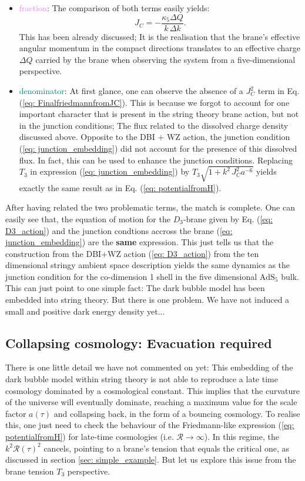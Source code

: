 \begin{itemize}
    \item \textcolor{violet}{fraction}: The comparison of both terms easily yields:
    \begin{equation}
        J_{C} = -\frac{\kappa_{5} \Delta Q}{ k \, \Delta k}. 
    \end{equation}
    This has been already discussed; It is the realisation that the brane's effective angular momentum in the compact directions translates to an effective charge $\Delta Q$ carried by the brane when observing the system from a five-dimensional perspective.
    \item \textcolor{teal}{denominator}: At first glance, one can observe the absence of a $J_{C}^{2}$ term in Eq. (\ref{eq: FinalfriedmannfromJC}). This is because we forgot to account for one important character that is present in the string theory brane action, but not in the junction conditions; The flux related to the dissolved charge density discussed above. Opposite to the DBI $+$ WZ action, the junction condition (\ref{eq: junction_embedding}) did not account for the presence of this dissolved flux. In fact, this can be used to enhance the junction conditions. Replacing $T_{3}$ in expression (\ref{eq: junction_embedding}) by $T_{3}\sqrt{1 + k^{2}\, J_{C}^{2} a^{-6}}$ yields exactly the same result as in Eq. (\ref{eq: potentialfromH}).
\end{itemize}
After having related the two problematic terms, the match is complete. One can easily see that, the equation of motion for the $D_{3}$-brane given by Eq. (\ref{eq: D3_action}) and the junction condtions accross the brane (\ref{eq: junction_embedding}) are the \textbf{same} expression. This just tells us that the construction from the DBI$+$WZ action (\ref{eq: D3_action}) from the ten dimensional stringy ambient space description yields the same dynamics as the junction condition for the co-dimension 1 shell in the five dimensional $\text{AdS}_{5}$ bulk. This can just point to one simple fact: The dark bubble model has been embedded into string theory. But there is one problem. We have not induced a small and positive dark energy density yet...

\subsection{Collapsing cosmology: Evacuation required} 
There is one little detail we have not commented on yet: This embedding of the dark bubble model within string theory is not able to reproduce a late time cosmology dominated by a cosmological constant. This implies that the curvature of the universe will eventually dominate, reaching a maximum value for the scale factor $a(\tau)$ and collapsing back, in the form of a bouncing cosmology. To realise this, one just need to check the behaviour of the Friedmann-like expression (\ref{eq: potentialfromH}) for late-time cosmologies (i.e. $\mathcal{R} \rightarrow \infty$). In this regime, the $k^{2} \mathcal{R}(\tau)^{2}$ cancels, pointing to a brane's tension that equals the critical one, as discussed in section \ref{sec: simple_example}. But let us explore this issue from the brane tension $T_{3}$ perspective.


